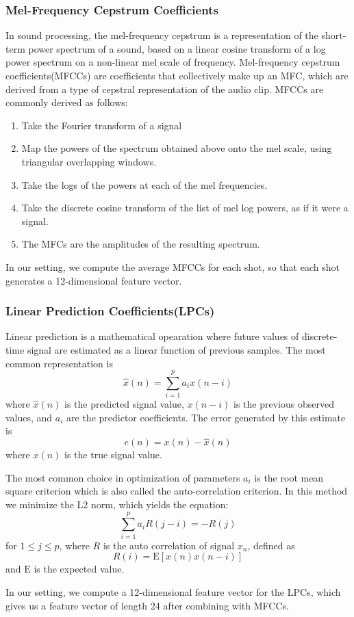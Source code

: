 \documentclass{article}
\begin{document}
\subsubsection{Mel-Frequency Cepstrum Coefficients}
In sound processing, the mel-frequency cepstrum is a representation of the short-term power spectrum of a sound, based on a linear cosine transform of a log power spectrum on a non-linear mel scale of frequency. Mel-frequency cepstrum coefficients(MFCCs) are coefficients that collectively make up an MFC, which are derived from a type of cepstral representation of the audio clip. MFCCs are commonly derived as follows:
\begin{enumerate}
\item Take the Fourier transform of a signal
\item Map the powers of the spectrum obtained above onto the mel scale, using triangular overlapping windows.
\item Take the logs of the powers at each of the mel frequencies.
\item Take the discrete cosine transform of the list of mel log powers, as if it were a signal.
\item The MFCs are the amplitudes of the resulting spectrum.
\end{enumerate}
In our setting, we compute the average MFCCs for each shot, so that each shot generates a 12-dimensional feature vector.
\subsubsection{Linear Prediction Coefficients(LPCs)}
Linear prediction is a mathematical opearation where future values of discrete-time signal are estimated as a linear function of previous samples. The most common representation is 
$$ \hat{x}(n) = \sum_{i=1}^{p} a_i x(n-i)$$
where $\hat{x}(n)$ is the predicted signal value, $x(n-i)$ is the previous observed values, and $a_i$ are the predictor coefficients. The error generated by this estimate is 
$$ e(n) = x(n) - \hat{x}(n)$$
where $x(n)$ is the true signal value. \par
The most common choice in optimization of parameters $a_i$ is the root mean square criterion which is also called the auto-correlation criterion. In this method we minimize the L2 norm, which yields the equation:
$$\sum_{i=1}^{p} a_i R(j-i) = -R(j)$$
for $1 \leq j \leq p$, where $R$ is the auto correlation of signal $x_n$, defined as
$$R(i) = \mathrm{E}[x(n)x(n-i)]$$
and $\mathrm{E}$ is the expected value.\par
In our setting, we compute a 12-dimensional feature vector for the LPCs, which gives us a feature vector of length 24 after combining with MFCCs.
\end{document}
